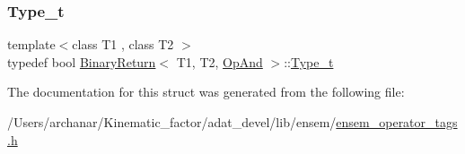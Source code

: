\subsubsection{\texorpdfstring{Type\_t}{Type\_t}\hspace{0.1cm}{\footnotesize\ttfamily [2/2]}}
{\footnotesize\ttfamily template$<$class T1 , class T2 $>$ \\
typedef bool \mbox{\hyperlink{structBinaryReturn}{Binary\+Return}}$<$ T1, T2, \mbox{\hyperlink{structOpAnd}{Op\+And}} $>$\+::\mbox{\hyperlink{structBinaryReturn_3_01T1_00_01T2_00_01OpAnd_01_4_a8eacc4b4e150e0f58ff37e1e48ff0649}{Type\+\_\+t}}}



The documentation for this struct was generated from the following file\+:\begin{DoxyCompactItemize}
\item 
/\+Users/archanar/\+Kinematic\+\_\+factor/adat\+\_\+devel/lib/ensem/\mbox{\hyperlink{lib_2ensem_2ensem__operator__tags_8h}{ensem\+\_\+operator\+\_\+tags.\+h}}\end{DoxyCompactItemize}
